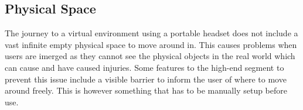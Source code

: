 \subsection{Physical Space}
The journey to a virtual environment using a portable headset does not include a vast infinite empty physical space to move around in. This causes problems when users are imerged as they cannot see the physical objects in the real world which can cause and have caused injuries\cite{VR_injuries:2_allen_2017,VR_injuries:steamed}. Some  features to the high-end segment to prevent this issue include a visible barrier to inform the user of where to move around freely. This is however something that has to be manually setup before use.\cite{VR_injuries:6_machkovech_2017}
